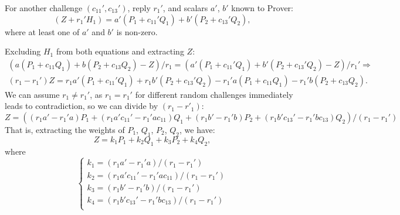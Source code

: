 \documentclass{mathcryptology} %
\theoremstyle{title}
\theoremstyle{titleof}
\renewenvironment{proof}{\noindent{\bfseries Proof:} }{}
\begin{document}
\begin{proof}
        For another challenge $\left(c_{11}', c_{13}'\right)$, reply $r_{1}'$, and scalars $a'$, $b'$ known to Prover:
        \begin{equation*}
            \left(Z+r_{1}' H_{1}\right) =a'\left(P_{1}+c_{11}' Q_{1}\right) + b'\left(P_{2}+c_{13}' Q_{2}\right),
        \end{equation*}
        where at least one of $a'$ and $b'$ is non-zero.

        Excluding $H_{1}$ from both equations and extracting $Z$:
        \begin{gather*}
            \left( a \left(P_{1} + c_{11} Q_{1}\right) + b\left( P_{2} + c_{13} Q_{2}\right) -Z\right)/r_{1}
                =\left(a'\left(P_{1}+c_{11}' Q_{1}\right) + b'\left( P_{2} + c_{13}' Q_{2}\right) -Z\right)/r_{1}' \Rightarrow \\
            \left(r_{1}-r_{1}' \right) Z
                = r_{1} a'\left(P_{1} + c_{11}' Q_{1}\right) + r_{1} b'\left(P_{2} + c_{13}' Q_{2}\right)-r_{1}' a\left(P_{1}
                    +c_{11} Q_{1}\right)-r_{1}' b\left( P_{2}+c_{13} Q_{2}\right).
        \end{gather*}
        We can assume $r_{1} \neq r_{1}'$, as $r_{1} = r_{1}'$ for different random challenges immediately leads to contradiction, so we can divide by $(r_{1}-r'_{1})$:
        \begin{equation*}
            Z = \left(\left(r_{1} a' - r_{1}' a\right) P_{1} + \left(r_{1} a' c_{11}' - r_{1}' ac_{11}\right) Q_{1} +
                \left(r_{1}b'  - r_{1}' b\right) P_{2} +
                \left(r_{1} b' c_{13}' - r_{1}' b c_{13}\right) Q_{2}\right) / \left(r_{1} - r_{1}'\right)
        \end{equation*}        
        That is, extracting the weights of $P_{1}$, $Q_{1}$, $P_{2}$, $Q_{2}$, we have:
        \begin{equation*}
        	Z=k_{1}P_{1}+k_{2}Q_{1}+k_{3}P_{2}+k_{4}Q_{2},
        \end{equation*}
        where
        \begin{equation*}
            \left\{
            \begin{array}{l}\label{Eq:2ast}\tag{**}
                k_{1} = \left(r_{1} a' - r_{1}' a\right)                /\left(r_{1} - r_{1}'\right)\\
                k_{2} = \left(r_{1} a' c_{11}' - r_{1}' a c_{11}\right) /\left(r_{1} - r_{1}'\right)\\
                k_{3} = \left(r_{1} b'  - r_{1}' b \right) /\left(r_{1} - r_{1}'\right)\\
                k_{4} = \left(r_{1} b' c_{13}' - r_{1}' b c_{13}\right)   /\left(r_{1} - r_{1}'\right)\\
            \end{array}\right.
        \end{equation*}
        

\end{proof}
\end{document}
